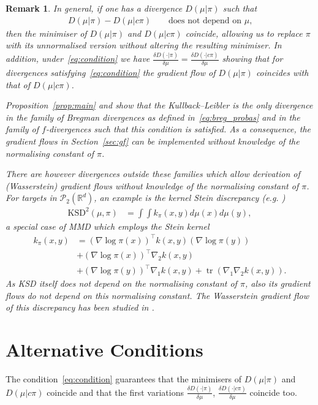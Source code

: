 \documentclass{article}
\newcommand{\cP}{\mathcal P}
\newcommand{\R}{\mathbb R}
\newtheorem{remark}{Remark}
\begin{document}
\begin{remark}


In general, if one has a divergence $D(\mu|\pi)$ such that 
\begin{align}
    \label{eq:condition}
    D(\mu|\pi)-D(\mu|c\pi)\qquad\textrm{does not depend on $\mu$,}
\end{align}
then the minimiser of $D(\mu|\pi)$ and $D(\mu|c\pi)$ coincide, allowing us to replace $\pi$ with its unnormalised version without altering the resulting minimiser. In addition, under~\eqref{eq:condition} we have $\frac{\delta D(\cdot|\pi)}{\delta \mu}=\frac{\delta D(\cdot|c\pi)}{\delta \mu}$ showing that for divergences satisfying~\eqref{eq:condition} the gradient flow of  $D(\mu|\pi)$ coincides with that of $D(\mu|c\pi)$.

Proposition~\ref{prop:main} and \citet[Theorem 3.1]{chen2023sampling} show that the Kullback--Leibler is the only divergence in the family of Bregman divergences as defined in~\eqref{eq:breg_probas} and in the family of $f$-divergences such that this condition is satisfied. 
As a consequence, the gradient flows in Section~\ref{sec:gf} can be implemented without knowledge of the normalising constant of $\pi$.

There are however divergences outside these families which allow derivation of (Wasserstein) gradient flows without knowledge of the normalising constant of $\pi$. For targets in $\cP_2(\R^d)$, an example is the kernel Stein discrepancy (e.g. \cite{pmlr-v70-gorham17a})
\begin{align*}
    \textrm{KSD}^2(\mu, \pi) &= \int\int k_\pi(x,y)d\mu(x)d\mu(y),
\end{align*}
a special case of MMD which employs the Stein kernel
\begin{align*}
k_\pi(x, y)  &= (\nabla \log \pi(x))^\top k(x,y)(\nabla \log \pi(y))\\
&
+ (\nabla \log \pi(x))^\top \nabla_2 k(x,y)\\
&+ (\nabla \log \pi(y))^\top \nabla_1 k(x,y)
+ \operatorname{tr}(\nabla_1 \nabla_2 k(x,y)).
\end{align*}
As KSD itself does not depend on the normalising constant of $\pi$, also its gradient flows do not depend on this normalising constant.
The Wasserstein gradient flow of this discrepancy has been studied in \cite{korba2021kernel}.


\end{remark}

\section{Alternative Conditions}
\label{sec:conditions}
The condition~\eqref{eq:condition} guarantees that the minimisers of $ D(\mu|\pi)$ and $D(\mu|c\pi)$ coincide and that the first variations $\frac{\delta D(\cdot|\pi)}{\delta \mu}$, $\frac{\delta D(\cdot|c\pi)}{\delta \mu}$ coincide too.
\end{document}
